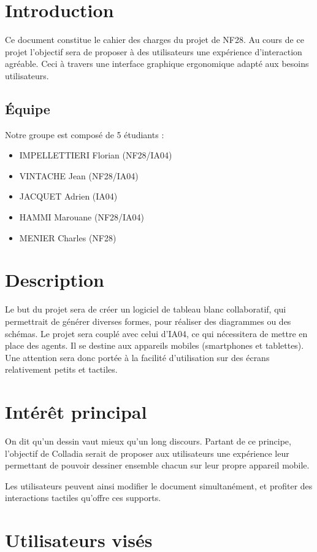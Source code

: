 \documentclass[a4paper,11pt]{article}
\begin{document}


\newpage
\section{Introduction}
Ce document constitue le cahier des charges du projet de NF28. Au cours de ce projet l'objectif sera de proposer à des utilisateurs une expérience d'interaction agréable. Ceci à travers une interface graphique ergonomique adapté aux besoins utilisateurs.

\subsection{Équipe}
Notre groupe est composé de 5 étudiants :
\begin{itemize}
\item IMPELLETTIERI Florian (NF28/IA04)
\item VINTACHE Jean (NF28/IA04)
\item JACQUET Adrien (IA04)
\item HAMMI Marouane (NF28/IA04)
\item MENIER Charles (NF28)
\end{itemize}
\section{Description}
Le but du projet sera de créer un logiciel de tableau blanc collaboratif, qui permettrait de générer diverses formes, pour réaliser des diagrammes ou des schémas.
Le projet sera couplé avec celui d'IA04, ce qui nécessitera de mettre en place des agents. Il se destine aux appareils mobiles (smartphones et tablettes). Une attention sera donc portée à la facilité d’utilisation sur des écrans relativement petits et tactiles.
\section{Intérêt principal}
On dit qu’un dessin vaut mieux qu’un long discours. Partant de ce principe, l’objectif de Colladia serait de proposer aux utilisateurs une expérience leur permettant de pouvoir dessiner ensemble chacun sur leur propre appareil mobile. 

Les utilisateurs peuvent ainsi modifier le document simultanément, et profiter des interactions tactiles qu’offre ces supports.

\section{Utilisateurs visés}
\end{document}
